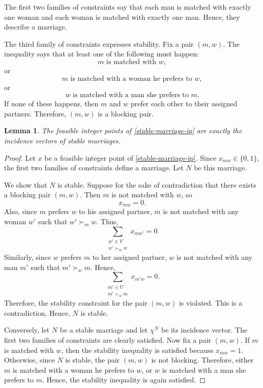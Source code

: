 \documentclass[12pt]{report}
\newtheorem{llemma}[base]{Lemma}
\numberwithin{algorithm}{chapter}
\begin{document}
	The first two families of constraints say that each man is matched with exactly one woman and each woman is matched with exactly one man. Hence, they describe a marriage.
	
	The third family of constraints expresses stability. Fix a pair $(m,w)$. The inequality says that at least one of the following must happen:
	\[
	m \text{ is matched with } w,
	\]
	or
	\[
	m \text{ is matched with a woman he prefers to } w,
	\]
	or
	\[
	w \text{ is matched with a man she prefers to } m.
	\]
	If none of these happens, then $m$ and $w$ prefer each other to their assigned partners. Therefore, $(m,w)$ is a blocking pair.
	
	\begin{llemma}
		The feasible integer points of \eqref{stable-marriage-ip} are exactly the incidence vectors of stable marriages.
	\end{llemma}
	
	\begin{proof}
		Let $x$ be a feasible integer point of \eqref{stable-marriage-ip}. Since $x_{mw}\in\{0,1\}$, the first two families of constraints define a marriage. Let $N$ be this marriage.
		
		We show that $N$ is stable. Suppose for the sake of contradiction that there exists a blocking pair $(m,w)$. Then $m$ is not matched with $w$, so
		\[
		x_{mw}=0.
		\]
		Also, since $m$ prefers $w$ to his assigned partner, $m$ is not matched with any woman $w'$ such that $w'\succ_m w$. Thus,
		\[
		\sum_{\substack{w'\in V\\ w'\succ_m w}} x_{mw'}=0.
		\]
		Similarly, since $w$ prefers $m$ to her assigned partner, $w$ is not matched with any man $m'$ such that $m'\succ_w m$. Hence,
		\[
		\sum_{\substack{m'\in U\\ m'\succ_w m}} x_{m'w}=0.
		\]
		Therefore, the stability constraint for the pair $(m,w)$ is violated. This is a contradiction. Hence, $N$ is stable.
		
		Conversely, let $N$ be a stable marriage and let $\chi^N$ be its incidence vector. The first two families of constraints are clearly satisfied. Now fix a pair $(m,w)$. If $m$ is matched with $w$, then the stability inequality is satisfied because $x_{mw}=1$. Otherwise, since $N$ is stable, the pair $(m,w)$ is not blocking. Therefore, either $m$ is matched with a woman he prefers to $w$, or $w$ is matched with a man she prefers to $m$. Hence, the stability inequality is again satisfied.
	\end{proof}
	
\end{document}
